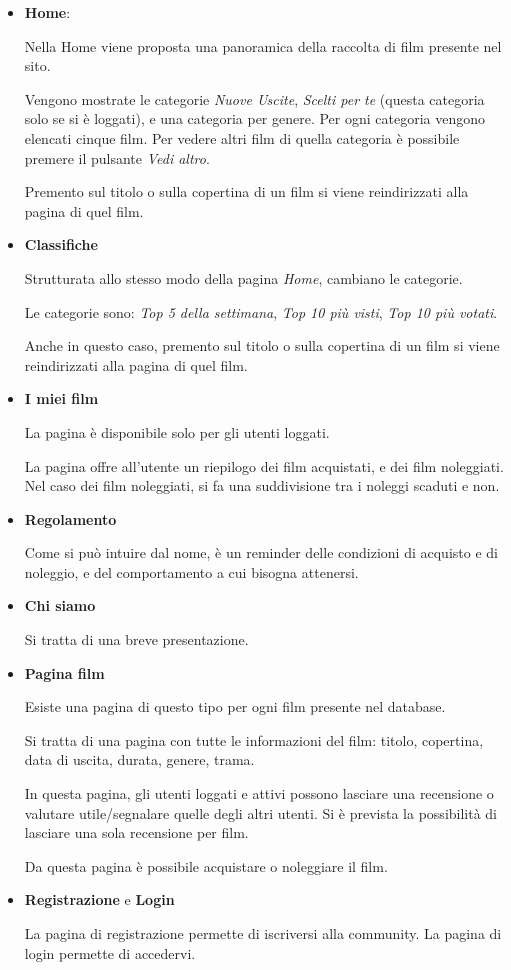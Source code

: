 \documentclass[a4paper]{article}
\begin{document}
\begin{itemize}
    \item \textbf{Home}:
    
    Nella Home viene proposta una panoramica della raccolta di film presente nel sito.

    Vengono mostrate le categorie \textit{Nuove Uscite}, \textit{Scelti per te} (questa categoria solo se si è loggati), e una categoria per genere.
    Per ogni categoria vengono elencati cinque film. Per vedere altri film di quella categoria è possibile premere il pulsante \textit{Vedi altro}.

    Premento sul titolo o sulla copertina di un film si viene reindirizzati alla pagina di quel film.

    \item \textbf{Classifiche}
    
    Strutturata allo stesso modo della pagina \textit{Home}, cambiano le categorie.

    Le categorie sono: \textit{Top 5 della settimana}, \textit{Top 10 più visti}, \textit{Top 10 più votati}.

    Anche in questo caso, premento sul titolo o sulla copertina di un film si viene reindirizzati alla pagina di quel film.

    \item \textbf{I miei film}
    
    La pagina è disponibile solo per gli utenti loggati.

    La pagina offre all'utente un riepilogo dei film acquistati, e dei film noleggiati. Nel caso dei film noleggiati, si fa una suddivisione tra i noleggi scaduti e non.

    \item \textbf{Regolamento}

    Come si può intuire dal nome, è un reminder delle condizioni di acquisto e di noleggio, e del comportamento a cui bisogna attenersi.

    \item \textbf{Chi siamo}
    
    Si tratta di una breve presentazione.

    \item \textbf{Pagina film}
    
    Esiste una pagina di questo tipo per ogni film presente nel database.

    Si tratta di una pagina con tutte le informazioni del film: titolo, copertina, data di uscita, durata, genere, trama.

    In questa pagina, gli utenti loggati e attivi possono lasciare una recensione o valutare utile/segnalare quelle degli altri utenti.
    Si è prevista la possibilità di lasciare una sola recensione per film.

    Da questa pagina è possibile acquistare o noleggiare il film.
    
    \item \textbf{Registrazione} e \textbf{Login}
    
    La pagina di registrazione permette di iscriversi alla community. La pagina di login permette di accedervi.

\end{itemize}
\end{document}
